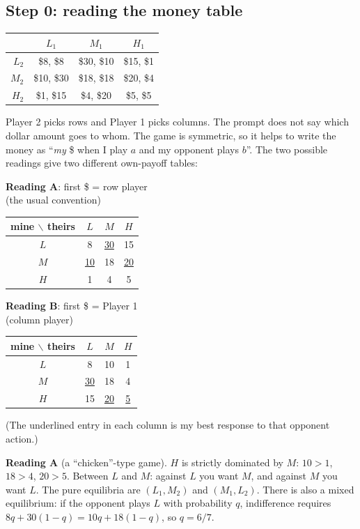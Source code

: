 \documentclass[11pt]{article}
\begin{document}
\subsection*{Step 0: reading the money table}
\begin{center}
\begin{tabular}{r|ccc}
 & $L_1$ & $M_1$ & $H_1$ \\ \hline
$L_2$ & \$8, \$8 & \$30, \$10 & \$15, \$1 \\
$M_2$ & \$10, \$30 & \$18, \$18 & \$20, \$4 \\
$H_2$ & \$1, \$15 & \$4, \$20 & \$5, \$5
\end{tabular}
\end{center}
Player 2 picks rows and Player 1 picks columns. The prompt does not say which dollar amount goes to whom. The game is symmetric, so it helps to write the money as ``\emph{my} \$ when I play $a$ and my opponent plays $b$''. The two possible readings give two different own-payoff tables:
\begin{center}
\begin{minipage}{0.46\textwidth}\centering
\textbf{Reading A}: first \$ = row player\\(the usual convention)\\[4pt]
\begin{tabular}{c|ccc}
mine $\backslash$ theirs & $L$ & $M$ & $H$ \\ \hline
$L$ & 8 & \underline{30} & 15 \\
$M$ & \underline{10} & 18 & \underline{20} \\
$H$ & 1 & 4 & 5
\end{tabular}
\end{minipage}
\hfill
\begin{minipage}{0.46\textwidth}\centering
\textbf{Reading B}: first \$ = Player 1\\(column player)\\[4pt]
\begin{tabular}{c|ccc}
mine $\backslash$ theirs & $L$ & $M$ & $H$ \\ \hline
$L$ & 8 & 10 & 1 \\
$M$ & \underline{30} & 18 & 4 \\
$H$ & 15 & \underline{20} & \underline{5}
\end{tabular}
\end{minipage}
\end{center}
(The underlined entry in each column is my best response to that opponent action.)

\textbf{Reading A} (a ``chicken''-type game). $H$ is strictly dominated by $M$: $10>1$, $18>4$, $20>5$. Between $L$ and $M$: against $L$ you want $M$, and against $M$ you want $L$. The pure equilibria are $(L_1,M_2)$ and $(M_1,L_2)$. There is also a mixed equilibrium: if the opponent plays $L$ with probability $q$, indifference requires $8q+30(1-q)=10q+18(1-q)$, so $q=6/7$.
\end{document}
